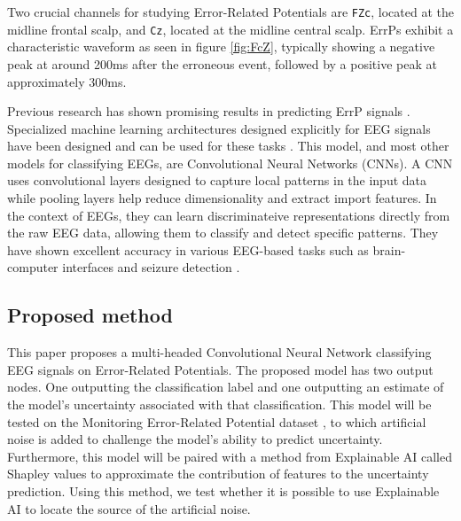 Two crucial channels for studying Error-Related Potentials are \verb|FZc|, located at the midline frontal scalp, and \verb|Cz|, located at the midline central scalp. ErrPs exhibit a characteristic waveform as seen in figure \ref{fig:FcZ}, typically showing a negative peak at around 200ms after the erroneous event, followed by a positive peak at approximately 300ms.

Previous research has shown promising results in predicting ErrP signals \citep{correia2021error}. Specialized machine learning architectures designed explicitly for EEG signals have been designed and can be used for these tasks \citep{lawhern2018eegnet}. This model, and most other models for classifying EEGs, are Convolutional Neural Networks (CNNs). A CNN uses convolutional layers designed to capture local patterns in the input data while pooling layers help reduce dimensionality and extract import features. In the context of EEGs, they can learn discriminateive representations directly from the raw EEG data, allowing them to classify and detect specific patterns. They have shown excellent accuracy in various EEG-based tasks such as brain-computer interfaces \citep{cecotti2010convolutional} and seizure detection \citep{zhou2018epileptic}.

\subsection{Proposed method}

This paper proposes a multi-headed Convolutional Neural Network classifying EEG signals on Error-Related Potentials. The proposed model has two output nodes. One outputting the classification label and one outputting an estimate of the model's uncertainty associated with that classification. This model will be tested on the Monitoring Error-Related Potential dataset \citep{chavarriaga2010learning}, to which artificial noise is added to challenge the model's ability to predict uncertainty. Furthermore, this model will be paired with a method from Explainable AI called Shapley values to approximate the contribution of features to the uncertainty prediction. Using this method, we test whether it is possible to use Explainable AI to locate the source of the artificial noise.